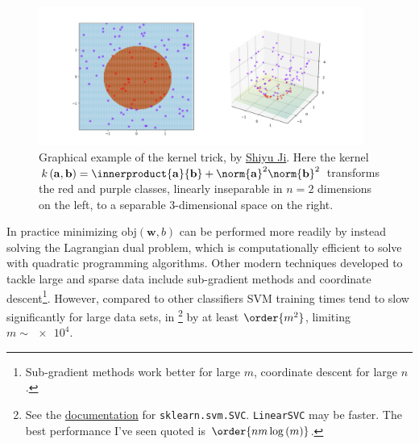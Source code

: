 \vspace{-0.2cm}%

\begin{figure}[H]
\centering
\includegraphics[width=0.95\textwidth]{figures/ml/kernel_trick_example.png}
\caption{
Graphical example of the kernel trick, by \href{https://en.wikipedia.org/wiki/File:Kernel_trick_idea.svg}{Shiyu Ji}.
Here the kernel $k\left(\mathbf{a},\mathbf{b}\right) = \innerproduct{\mathbf{a}}{\mathbf{b}} + \norm{\mathbf{a}}^{2} \norm{\mathbf{b}}^{2}$
transforms the red and purple classes, linearly inseparable in $n=2$ dimensions on the left,
to a separable $3$-dimensional space on the right.
}
\label{fig:svm_kernel_trick}
\end{figure}

In practice minimizing $\text{obj}\left(\mathbf{w}, b\right)$ can be
performed more readily by instead solving the Lagrangian dual problem,
which is computationally efficient to solve with quadratic programming algorithms.
Other modern techniques developed to tackle large and sparse data include
sub-gradient methods and coordinate descent\footnote{Sub-gradient methods work better for large $m$,
coordinate descent for large $n$.}.
However, compared to other classifiers SVM training times
tend to slow significantly for large data sets,
in \sklearn\footnote{See the
\href{https://scikit-learn.org/stable/modules/generated/sklearn.svm.SVC.html}{documentation}
for \texttt{sklearn.svm.SVC}.
\texttt{LinearSVC} may be faster.
The best performance I've seen quoted is $\order{n m \log{\left(m\right)}}$.} by
at least $\order{m^{2}}$, limiting $m \sim \num{e4}$.


